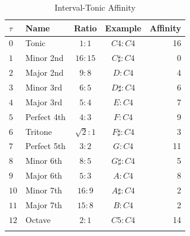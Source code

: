 \documentclass[sn-mathphys]{sn-jnl}%
\begin{document}
\begin{table}[h]
\begin{center}
\begin{minipage}{174pt}
\caption{Interval-Tonic Affinity}\label{tab1}%
\begin{tabular}{@{}llccr@{}}
\toprule
$\tau$ \footnotemark[1] & Name  & Ratio \footnotemark[2] & Example & Affinity  \\
\midrule
$0$ & Tonic & $1:1$ & $C4:C4$ & 16 \\
$1$ & Minor 2nd & $16:15$ & $C\sharp:C4$ & 0 \\
$2$ & Major 2nd & $9:8$ & $D:C4$ & 4 \\
$3$ & Minor 3rd & $6:5$ & $D\sharp:C4$ & 6 \\
$4$ & Major 3rd & $5:4$ & $E:C4$ & 7 \\
$5$ & Perfect 4th & $4:3$ & $F:C4$ & 9 \\
$6$ & Tritone \footnotemark[3] & $\sqrt{2}:1 $ & $F\sharp:C4$ & 3 \\
$7$ & Perfect 5th & $3:2$ & $G:C4$ & 11 \\
$8$ & Minor 6th & $8:5$ & $G\sharp:C4$ & 5 \\
$9$ & Major 6th & $5:3$ & $A:C4$ & 8 \\
$10$ & Minor 7th & $16:9$ & $A\sharp:C4$ & 2 \\
$11$ & Major 7th & $15:8$ & $B:C4$ & 2 \\
$12$ & Octave & $2:1$ & $C5:C4$ & 14 \\
\botrule
\end{tabular}
\end{minipage}
\end{center}
\end{table}
\end{document}
